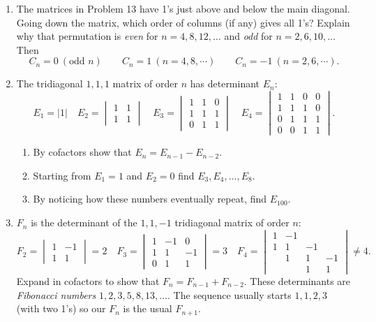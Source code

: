 \documentclass[14pt, a4paper]{article}
\begin{document}
\begin{enumerate}[resume]
    \item The matrices in Problem 13 have 1's just above and below the main diagonal. Going down the matrix, which order of columns (if any) gives all 1's? Explain why that permutation is \textit{even} for $n = 4, 8, 12, \dots$ and \textit{odd} for $n = 2, 6, 10, \dots$ Then
          \[
              C_n = 0 \ (\text{odd } n) \qquad C_n = 1 \ (n = 4, 8, \cdots) \qquad C_n = -1 \ (n = 2, 6, \cdots).
          \]

    \item The tridiagonal $1, 1, 1$ matrix of order $n$ has determinant $E_n$:
          \[
              E_1 = |1| \quad
              E_2 = \begin{vmatrix} 1 & 1 \\ 1 & 1 \end{vmatrix} \quad
              E_3 = \begin{vmatrix} 1 & 1 & 0 \\ 1 & 1 & 1 \\ 0 & 1 & 1 \end{vmatrix} \quad
              E_4 = \begin{vmatrix} 1 & 1 & 0 & 0 \\ 1 & 1 & 1 & 0 \\ 0 & 1 & 1 & 1 \\ 0 & 0 & 1 & 1 \end{vmatrix} .
          \]
          \begin{enumerate}
              \item[(a)] By cofactors show that $E_n = E_{n-1} - E_{n-2}$.
              \item[(b)] Starting from $E_1 = 1$ and $E_2 = 0$ find $E_3, E_4, \dots, E_8$.
              \item[(c)] By noticing how these numbers eventually repeat, find $E_{100}$.
          \end{enumerate}

    \item $F_n$ is the determinant of the $1, 1, -1$ tridiagonal matrix of order $n$:
          \[
              F_2 = \begin{vmatrix} 1 & -1 \\ 1 & 1 \end{vmatrix} = 2 \quad
              F_3 = \begin{vmatrix} 1 & -1 & 0 \\ 1 & 1 & -1 \\ 0 & 1 & 1 \end{vmatrix} = 3 \quad
              F_4 = \begin{vmatrix} 1 & -1 &  &  \\ 1 & 1 & -1 &  \\  & 1 & 1 & -1 \\  &  & 1 & 1 \end{vmatrix} \neq 4.
          \]
          Expand in cofactors to show that $F_n = F_{n-1} + F_{n-2}$. These determinants are \textit{Fibonacci numbers} $1, 2, 3, 5, 8, 13, \dots$. The sequence usually starts $1, 1, 2, 3$ (with two 1's) so our $F_n$ is the usual $F_{n+1}$.


\end{enumerate}
\end{document}
